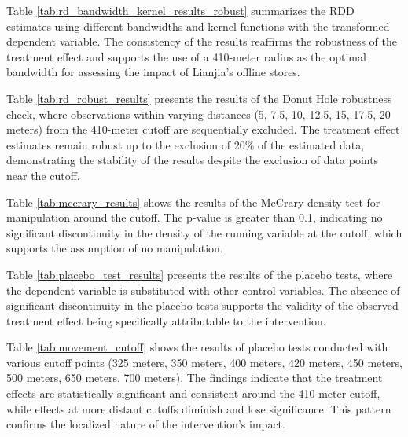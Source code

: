 \documentclass[11pt]{article}
\begin{document}
Table \ref{tab:rd_bandwidth_kernel_results_robust} summarizes the RDD estimates using different bandwidths and kernel functions with the transformed dependent variable. The consistency of the results reaffirms the robustness of the treatment effect and supports the use of a 410-meter radius as the optimal bandwidth for assessing the impact of Lianjia's offline stores.



Table \ref{tab:rd_robust_results} presents the results of the Donut Hole robustness check, where observations within varying distances (5, 7.5, 10, 12.5, 15, 17.5, 20 meters) from the 410-meter cutoff are sequentially excluded. The treatment effect estimates remain robust up to the exclusion of 20\% of the estimated data, demonstrating the stability of the results despite the exclusion of data points near the cutoff.



Table \ref{tab:mccrary_results} shows the results of the McCrary density test for manipulation around the cutoff. The p-value is greater than 0.1, indicating no significant discontinuity in the density of the running variable at the cutoff, which supports the assumption of no manipulation.




Table \ref{tab:placebo_test_results} presents the results of the placebo tests, where the dependent variable is substituted with other control variables. The absence of significant discontinuity in the placebo tests supports the validity of the observed treatment effect being specifically attributable to the intervention.



Table \ref{tab:movement_cutoff} shows the results of placebo tests conducted with various cutoff points (325 meters, 350 meters, 400 meters, 420 meters, 450 meters, 500 meters, 650 meters, 700 meters). The findings indicate that the treatment effects are statistically significant and consistent around the 410-meter cutoff, while effects at more distant cutoffs diminish and lose significance. This pattern confirms the localized nature of the intervention's impact.




\end{document}
